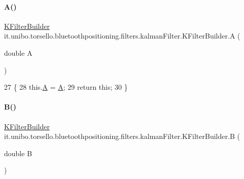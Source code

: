 \paragraph{\texorpdfstring{A()}{A()}}
{\footnotesize\ttfamily \hyperlink{classit_1_1unibo_1_1torsello_1_1bluetoothpositioning_1_1filters_1_1kalmanFilter_1_1KFilterBuilder}{K\+Filter\+Builder} it.\+unibo.\+torsello.\+bluetoothpositioning.\+filters.\+kalman\+Filter.\+K\+Filter\+Builder.\+A (\begin{DoxyParamCaption}\item[{double}]{A }\end{DoxyParamCaption})}


\begin{DoxyCode}
27                                       \{
28         this.\hyperlink{classit_1_1unibo_1_1torsello_1_1bluetoothpositioning_1_1filters_1_1kalmanFilter_1_1KFilterBuilder_ad93db15bf28d834081e9fb3df0daad9a_ad93db15bf28d834081e9fb3df0daad9a}{A} = \hyperlink{classit_1_1unibo_1_1torsello_1_1bluetoothpositioning_1_1filters_1_1kalmanFilter_1_1KFilterBuilder_ad93db15bf28d834081e9fb3df0daad9a_ad93db15bf28d834081e9fb3df0daad9a}{A};
29         \textcolor{keywordflow}{return} \textcolor{keyword}{this};
30     \}
\end{DoxyCode}
\hypertarget{classit_1_1unibo_1_1torsello_1_1bluetoothpositioning_1_1filters_1_1kalmanFilter_1_1KFilterBuilder_a50144e5d1e1b7b28534739502e64a103_a50144e5d1e1b7b28534739502e64a103}{}\label{classit_1_1unibo_1_1torsello_1_1bluetoothpositioning_1_1filters_1_1kalmanFilter_1_1KFilterBuilder_a50144e5d1e1b7b28534739502e64a103_a50144e5d1e1b7b28534739502e64a103} 
\paragraph{\texorpdfstring{B()}{B()}}
{\footnotesize\ttfamily \hyperlink{classit_1_1unibo_1_1torsello_1_1bluetoothpositioning_1_1filters_1_1kalmanFilter_1_1KFilterBuilder}{K\+Filter\+Builder} it.\+unibo.\+torsello.\+bluetoothpositioning.\+filters.\+kalman\+Filter.\+K\+Filter\+Builder.\+B (\begin{DoxyParamCaption}\item[{double}]{B }\end{DoxyParamCaption})}


